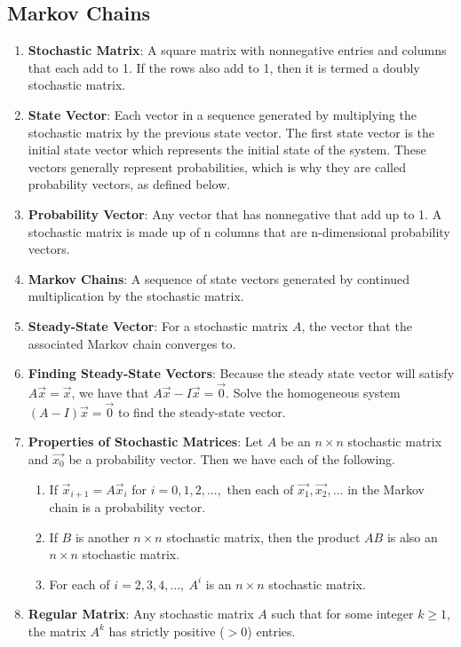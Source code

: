 \documentclass[10pt]{article}
\begin{document}
\subsection{Markov Chains}
\begin{enumerate}
\item \textbf{Stochastic Matrix}: A square matrix with nonnegative entries and columns that each add to 1. If the rows also add to 1, then it is termed a doubly stochastic matrix.
\item \textbf{State Vector}: Each vector in a sequence generated by multiplying the stochastic matrix by the previous state vector. The first state vector is the initial state vector which represents the initial state of the system. These vectors generally represent probabilities, which is why they are called probability vectors, as defined below.
\item \textbf{Probability Vector}: Any vector that has nonnegative that add up to 1. A stochastic matrix is made up of n columns that are n-dimensional probability vectors.
\item \textbf{Markov Chains}: A sequence of state vectors generated by continued multiplication by the stochastic matrix.
\item \textbf{Steady-State Vector}: For a stochastic matrix $A$, the vector that the associated Markov chain converges to.
\item \textbf{Finding Steady-State Vectors}: Because the steady state vector will satisfy $A\vec{x} = \vec{x}$, we have that $A\vec{x} - I\vec{x} = \vec{0}$. Solve the homogeneous system $(A-I)\vec{x} = \vec{0}$ to find the steady-state vector.
\item \textbf{Properties of Stochastic Matrices}: Let $A$ be an $n \times n$ stochastic matrix and $\vec{x_0}$ be a probability vector. Then we have each of the following.
\begin{enumerate}
\item If $\vec{x}_{i+1} = A\vec{x}_i$ for $i = 0,1,2,...,$ then each of $\vec{x_1},\vec{x_2},...$ in the Markov chain is a probability vector.
\item If $B$ is another $n \times n$ stochastic matrix, then the product $AB$ is also an $n \times n$ stochastic matrix.
\item For each of $i = 2,3,4,...,\ A^i$ is an $n \times n$ stochastic matrix.
\end{enumerate}
\item \textbf{Regular Matrix}: Any stochastic matrix $A$ such that for some integer $k \geq 1$, the matrix $A^k$ has strictly positive ($> 0$) entries.

\end{enumerate}
\end{document}
